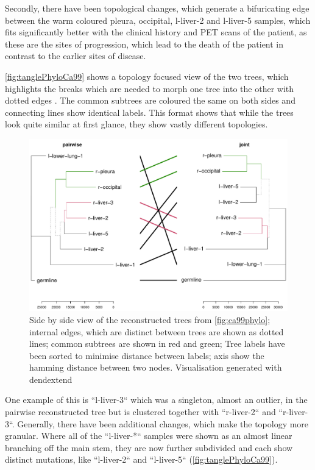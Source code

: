 Secondly, there have been topological changes, which generate a bifuricating edge between the warm coloured pleura, occipital, l-liver-2 and l-liver-5 samples, which fits significantly better with the clinical history and PET scans of the patient, as these are the sites of progression, which lead to the death of the patient in contrast to the earlier sites of disease.

\autoref{fig:tanglePhyloCa99} shows a topology focused view of the two trees, which highlights the breaks which are needed to morph one tree into the other with dotted edges \cite{Vienne2018}. The common subtrees are coloured the same on both sides and connecting lines show identical labels. This format shows that while the trees look quite similar at first glance, they show vastly different topologies.

\begin{figure}[!ht]
\centering
\includegraphics[width=.99\linewidth]{Figures/tanglePhyloCA99.pdf}
\caption[Tanglegram of the reconstructed phylogenies]{Side by side view of the reconstructed trees from \autoref{fig:ca99phylo}; internal edges, which are distinct between trees are shown as dotted lines; common subtrees are shown in red and green; Tree labels have been sorted to minimise distance between labels; axis show the hamming distance between two nodes. Visualisation generated with dendextend \cite{Galili2015}}\label{fig:tanglePhyloCa99}
\end{figure}

One example of this is ``l-liver-3`` which was a singleton, almost an outlier, in the pairwise reconstructed tree but is clustered together with ``r-liver-2`` and ``r-liver-3``. Generally, there have been additional changes, which make the topology more granular. Where all of the ``l-liver-*`` samples were shown as an almost linear branching off the main stem, they are now further subdivided and each show distinct mutations, like ``l-liver-2`` and ``l-liver-5`` (\autoref{fig:tanglePhyloCa99}).



